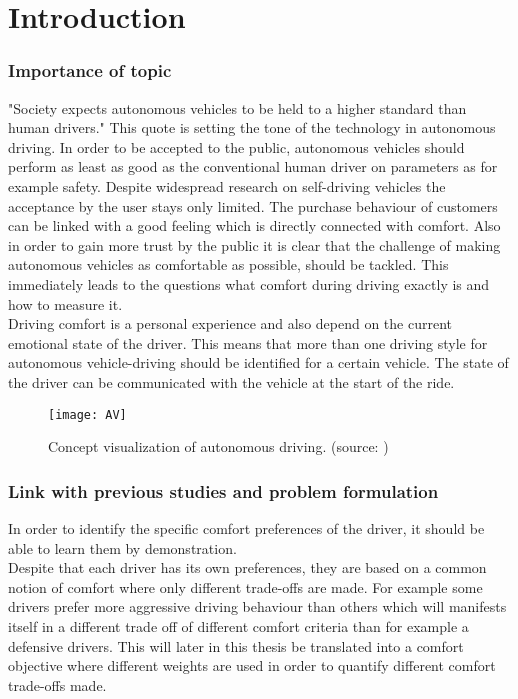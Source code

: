 \chapter{Introduction}
\label{cha:intro}
\subsection{Importance of topic}
"Society expects autonomous vehicles to be held to a higher standard than human drivers." \cite{Prof.Amnon} This quote is setting the tone of the technology in autonomous driving. In order to be accepted to the public, autonomous vehicles should perform as least as good as the conventional human driver on parameters as for example safety. Despite widespread research on self-driving vehicles the acceptance by the user stays only limited.\cite{Bae2019} The purchase behaviour of customers can be linked with a good feeling which is directly connected with comfort. Also in order to gain more trust by the public it is clear that the challenge of making autonomous vehicles as comfortable as possible, should be tackled. This immediately leads to the questions what comfort during driving exactly is and how to measure it.\\
Driving comfort is a personal experience and also depend on the current emotional state of the driver. This means that more than one driving style for autonomous vehicle-driving should be identified for a certain vehicle. \cite{Eindhoven2019} The state of the driver can be communicated with the vehicle at the start of the ride. 

\begin{figure}[h!]
	\centering
	\texttt{[image: AV]}
	\caption{Concept visualization of autonomous driving. (source: \cite{AV})}
	\label{fig:AV}
\end{figure} 

\subsection{Link with previous studies and problem formulation}

In order to identify the specific comfort preferences of the driver, it should be able to learn them by demonstration. \cite{Kuderer2015a}\\
Despite that each driver has its own preferences, they are based on a common notion of comfort where only different trade-offs are made. For example some drivers prefer more aggressive driving behaviour than others which will manifests itself in a different trade off of different comfort criteria than for example a defensive drivers. This will later in this thesis be translated into a comfort objective where different weights are used in order to quantify different comfort trade-offs made. \\


